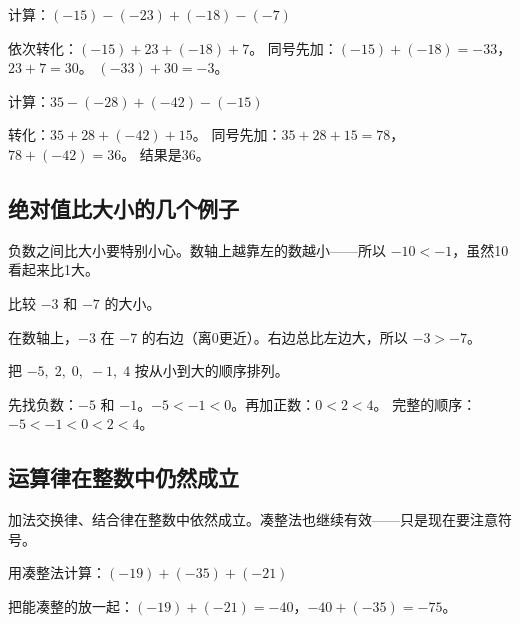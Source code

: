 \begin{example}
计算：$(-15)-(-23)+(-18)-(-7)$
\end{example}
\begin{solution}
依次转化：$(-15)+23+(-18)+7$。
同号先加：$(-15)+(-18) = -33$，$23+7=30$。
$(-33)+30 = -3$。
\end{solution}

\begin{example}
计算：$35-(-28)+(-42)-(-15)$
\end{example}
\begin{solution}
转化：$35+28+(-42)+15$。
同号先加：$35+28+15 = 78$，$78+(-42)=36$。
结果是36。
\end{solution}

\subsection*{绝对值比大小的几个例子}

负数之间比大小要特别小心。数轴上越靠左的数越小——所以 $-10 < -1$，虽然10看起来比1大。

\begin{example}
比较 $-3$ 和 $-7$ 的大小。
\end{example}
\begin{solution}
在数轴上，$-3$ 在 $-7$ 的右边（离0更近）。右边总比左边大，所以 $-3 > -7$。
\end{solution}

\begin{example}
把 $-5,\;2,\;0,\;-1,\;4$ 按从小到大的顺序排列。
\end{example}
\begin{solution}
先找负数：$-5$ 和 $-1$。$-5 < -1 < 0$。再加正数：$0 < 2 < 4$。
完整的顺序：$-5 < -1 < 0 < 2 < 4$。
\end{solution}

\subsection*{运算律在整数中仍然成立}

加法交换律、结合律在整数中依然成立。凑整法也继续有效——只是现在要注意符号。

\begin{example}
用凑整法计算：$(-19)+(-35)+(-21)$
\end{example}
\begin{solution}
把能凑整的放一起：$(-19)+(-21) = -40$，$-40+(-35) = -75$。
\end{solution}

